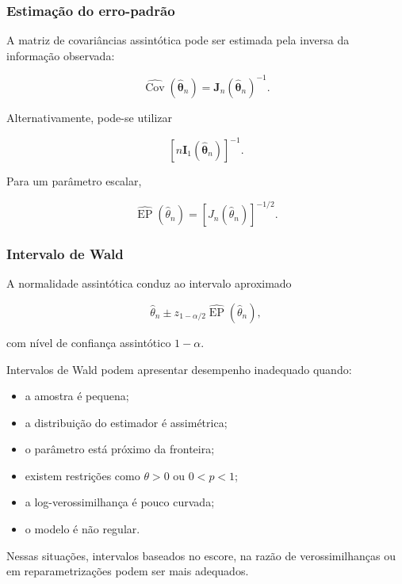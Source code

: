 \documentclass[
  letterpaper,
  DIV=11,
  numbers=noendperiod]{scrreprt}
\providecommand{\tightlist}{%
  \setlength{\itemsep}{0pt}\setlength{\parskip}{0pt}}\usepackage{longtable,booktabs,array}
\begin{document}
\subsubsection{Estimação do
erro-padrão}\label{estimauxe7uxe3o-do-erro-padruxe3o}

A matriz de covariâncias assintótica pode ser estimada pela inversa da
informação observada:

\[\widehat{\operatorname{Cov}}
\left(
\widehat{\boldsymbol\theta}_n
\right)
=
\mathbf{J}_n
\left(
\widehat{\boldsymbol\theta}_n
\right)^{-1}.\]

Alternativamente, pode-se utilizar

\[\left[
n\mathbf{I}_1
\left(
\widehat{\boldsymbol\theta}_n
\right)
\right]^{-1}.\]

Para um parâmetro escalar,

\[\widehat{\operatorname{EP}}
(\widehat\theta_n)
=
\left[
J_n(\widehat\theta_n)
\right]^{-1/2}.\]

\subsubsection{Intervalo de Wald}\label{intervalo-de-wald}

A normalidade assintótica conduz ao intervalo aproximado

\[\widehat\theta_n
\pm
z_{1-\alpha/2}
\widehat{\operatorname{EP}}
(\widehat\theta_n),\]

com nível de confiança assintótico \(1-\alpha\).

\begin{tcolorbox}[enhanced jigsaw, colback=white, leftrule=.75mm, colbacktitle=quarto-callout-warning-color!10!white, breakable, titlerule=0mm, bottomtitle=1mm, title=\textcolor{quarto-callout-warning-color}{\faExclamationTriangle}\hspace{0.5em}{Observação}, colframe=quarto-callout-warning-color-frame, toprule=.15mm, opacityback=0, bottomrule=.15mm, opacitybacktitle=0.6, arc=.35mm, toptitle=1mm, rightrule=.15mm, coltitle=black, left=2mm]

Intervalos de Wald podem apresentar desempenho inadequado quando:

\begin{itemize}
\tightlist
\item
  a amostra é pequena;
\item
  a distribuição do estimador é assimétrica;
\item
  o parâmetro está próximo da fronteira;
\item
  existem restrições como \(\theta>0\) ou \(0<p<1\);
\item
  a log-verossimilhança é pouco curvada;
\item
  o modelo é não regular.
\end{itemize}

Nessas situações, intervalos baseados no escore, na razão de
verossimilhanças ou em reparametrizações podem ser mais adequados.

\end{tcolorbox}
\end{document}
